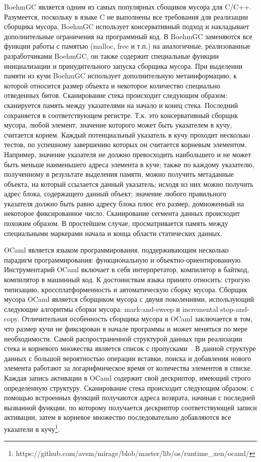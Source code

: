 \documentclass{matmex-diploma}
\begin{document}
BoehmGC является одним из самых популярных сбощиков мусора для C/C++. Разумеется, поскольку в языке C не выполнены все требования для реализации сборщика мусора, BoehmGC использует консервативный подход и накладывает дополнительные ограничения на программный код. В BoehmGC заменяются все функции работы с памятью (malloc, free и т.п.) на аналогичные, реализованные разработчиками BoehmGC, он также содержит специальные функции инициализации и принудительного запуска сборщика мусора. При выделении памяти из кучи BoehmGC использует дополнительную метаинформацию, к которой относится размер объекта и некоторое количество специально отведенных битов. Сканирование стека происходит следующим образом: сканируется память между указателями на начало и конец стека. Последний сохраняется в соответствующем регистре. Т.к. это консервативный сборщик мусора, любой элемент, значение которого может быть указателем в кучу, считается корнем. Каждый потенциальный указатель в кучу проходит несколько тестов, по успешному завершению которых он считается корневым элементом. Например, значение указателя не должно превосходить наибольшего и не может быть меньше наименьшего адреса элемента в куче; также по каждому указателю, полученному в результате выделения памяти, можно получить метаданные объекта, на который ссылается данный указатель; исходя из них можно получить адрес блока, содержащего данный объект; значение любого правильного указателя должно быть равно адресу блока плюс его размер, домноженный на некоторое фиксированное число. Сканирование сегмента данных происходит похожим образом. В простейшем случае, просматривается память между специальными маркерами начала и конца области статических данных.

OCaml является языком программирования, поддерживающим несколько парадигм программирования: функциональную и
объектно-ориентированную. Инструментарий OCaml включает в себя интерпретатор, компилятор в байткод, компилятор в
машинный код. К достоинствам языка принято относить: строгую типизацию, кроссплатформенность и автоматическую
сборку мусора. Сборщик мусора OCaml является сборщиком мусора с двумя поколениями, использующий следующие
алгоритмы сборки мусора: mark-and-sweep и incremental stop-and-copy. Отличительная особенность сборщика мусора
в OCaml заключается в том, что размер кучи не фиксирован в начале программы и может меняться по мере необходимости.
Самой распространенной структурой данных при реализации стека и корневого множества является список с пропусками~\cite{ref4}.
В данной структуре данных с большой вероятностью операции вставки, поиска и добавления нового элемента работают за логарифмическое время от количества элементов в списке. Каждая запись активации в OCaml содержит свой дескриптор, имеющий строго определенную структуру. Сканирование стека происходит следующим образом: с помощью встроенных функций получаются адреса возврата, начиная с последней вызванной функции, по которому получается дескриптор соответствующей записи активации, затем в корневое множество последовательно добавляются все указатели в кучу\footnote{https://github.com/avsm/mirage/blob/master/lib/os/runtime\_xen/ocaml/}.
\end{document}
